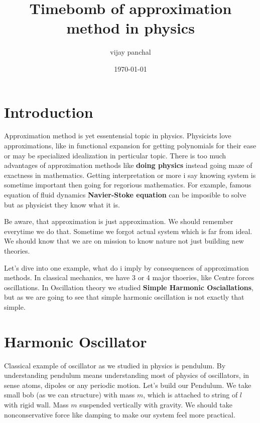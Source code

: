 \documentclass[11pt]{article}
\author{vijay panchal}
\date{\today}
\title{Timebomb of approximation method in physics}
\begin{document}
\maketitle
\tableofcontents


\section{Introduction}
\label{sec:org168acda}

Approximation method is yet essentensial topic in physics. Physicists love approximations, like in functional expansion for getting polynomials for their ease or may be specialized idealization in perticular topic. There is too much advantages of approximation methods like \textbf{doing physics} instead going maze of exactness in mathematics. Getting interpretation or more i say knowing system is sometime important then going for regorious mathematics. For example, famous equation of fluid dynamics \textbf{Navier-Stoke equation} can be imposible to solve but as physicist they know what it is.

Be aware, that approximation is just approximation. We should remember everytime we do that. Sometime we forgot actual system which is far from ideal. We should know that we are on mission to know nature not just building new theories.

Let's dive into one example, what do i imply by consequences of approximation methods. In classical mechanics, we have 3 or 4 major thoeries, like Centre forces oscillations. In Oscillation theory we studied \textbf{Simple Harmonic Osciallations}, but as we are going to see that simple harmonic oscillation is not exactly that simple.

\section{Harmonic Oscillator}
\label{sec:orgcc1f238}

Classical example of oscillator as we studied in physics is pendulum. By understanding pendulum means understanding most of physics of oscillators, in sense atoms, dipoles or any periodic motion. Let's build our Pendulum. We take small bob (as we can structure) with mass \(m\), which is attached to string of \(l\) with rigid wall. Mass \(m\) suspended vertically with gravity. We should take nonconservative force like damping to make our system feel more practical.  
\end{document}
